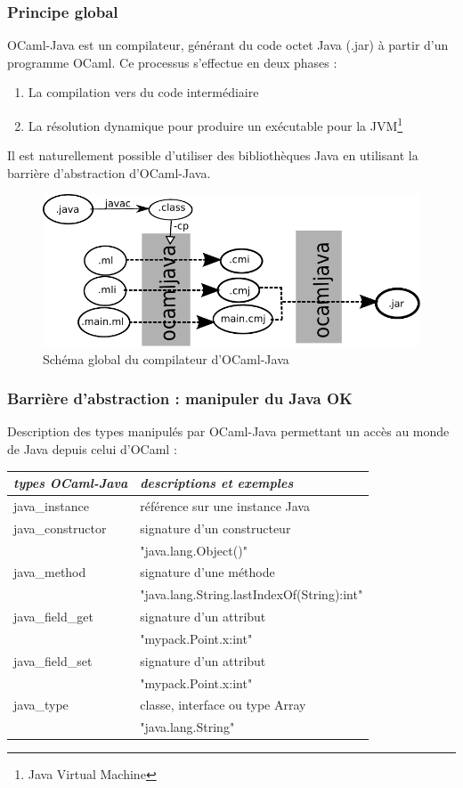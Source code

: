 \documentclass[a4paper, 11pt]{article}
\begin{document}
\subsubsection{Principe global}

OCaml-Java est un compilateur, générant du code octet Java (.jar) à
partir d'un programme OCaml. Ce processus s'effectue en deux phases :
\begin{enumerate}
\item La compilation vers du code intermédiaire 
\item La résolution dynamique pour produire un exécutable pour la
  JVM\footnote{Java Virtual Machine}
\end{enumerate}
Il est naturellement possible d'utiliser des bibliothèques Java en
utilisant la barrière d'abstraction d'OCaml-Java.

\begin{figure}[h!]
  \centering
  \includegraphics{schemaOCamlJava.pdf}
  \caption{Schéma global du compilateur d'OCaml-Java}
\end{figure}

\subsubsection{Barrière d'abstraction : manipuler du Java OK}
\noindent
Description des types manipulés par OCaml-Java permettant un accès au
monde de Java depuis celui d'OCaml :

\begin{tabular}{|l|l|}
  \hline
  \emph{types OCaml-Java} & \emph{descriptions et exemples} \\\hline
  java\_instance & référence sur une instance Java  \\
  \hline
  java\_constructor & signature d'un constructeur  \\
  &  "java.lang.Object()" \\
  \hline
  java\_method & signature d'une méthode \\
  & "java.lang.String.lastIndexOf(String):int"\\
  \hline
  java\_field\_get & signature d'un attribut\\
  & "mypack.Point.x:int" \\
  \hline
  java\_field\_set & signature d'un attribut\\
  & "mypack.Point.x:int" \\
  \hline
  java\_type & classe, interface ou type Array\\
  & "java.lang.String"\\
  \hline
\end{tabular}
\end{document}
